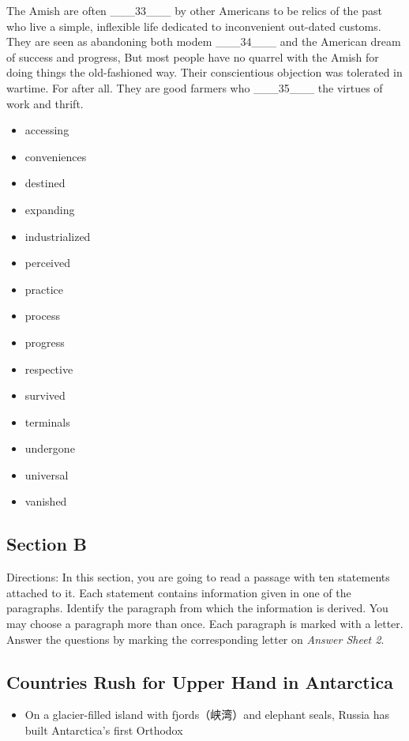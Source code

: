\documentclass[UTF8,11pt]{ctexart}
\begin{document}
The Amish are often \_\_\_33\_\_\_ by other Americans to be relics of the past who live a simple, inflexible life dedicated to inconvenient out-dated customs. They are seen as abandoning both modem \_\_\_34\_\_\_ and the American dream of success and progress, But most people have no quarrel with the Amish for doing things the old-fashioned way. Their conscientious objection was tolerated in wartime. For after all. They are good farmers who \_\_\_35\_\_\_ the virtues of work and thrift.


\begin{itemize}[leftmargin=2em,itemsep=.2em,topsep=.4em]\item[A.] accessing
\item[B.] conveniences
\item[C.] destined
\item[D.] expanding
\item[E.] industrialized
\item[F.] perceived
\item[G.] practice
\item[H.] process
\item[I.] progress
\item[J.] respective
\item[K.] survived
\item[L.] terminals
\item[M.] undergone
\item[N.] universal
\item[O.] vanished
\end{itemize}

\subsection*{Section B}


Directions: In this section, you are going to read a passage with ten statements attached to it. Each statement contains information given in one of the paragraphs. Identify the paragraph from which the information is derived. You may choose a paragraph more than once. Each paragraph is marked with a letter. Answer the questions by marking the corresponding letter on\textit{ Answer Sheet 2}.


\subsection*{\textbf{Countries Rush for Upper Hand in Antarctica}}


\begin{itemize}[leftmargin=2em,itemsep=.2em,topsep=.4em]\item[A.] On a glacier-filled island with fjords（峡湾）and elephant seals, Russia has built Antarctica’s first Orthodox
\end{itemize}
\end{document}
